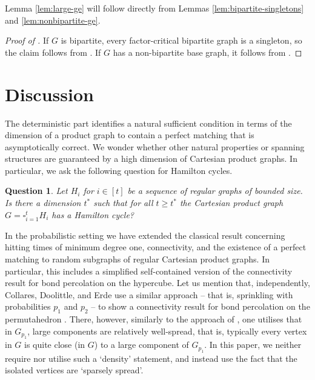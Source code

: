 \documentclass[notitlepage]{scrartcl}
\newtheorem{question}[thm]{Question}
\begin{document}
Lemma \ref{lem:large-ge} will follow directly from Lemmas \ref{lem:bipartite-singletons} and \ref{lem:nonbipartite-ge}.

\begin{proof}[Proof of ]
If $G$ is bipartite, every factor-critical bipartite graph is a singleton, so the claim follows from .
If $G$ has a non-bipartite base graph, it follows from .
\end{proof}



\section{Discussion}\label{s:discussion}

The deterministic part identifies a natural sufficient condition in terms of the dimension of a product graph to contain a perfect matching that is asymptotically correct. We wonder whether other natural properties or spanning structures are guaranteed by a high dimension of Cartesian product graphs. In particular, we ask the following question for Hamilton cycles.
\begin{question}
    Let $H_i$ for $i \in [t]$ be a sequence of regular graphs of bounded size. Is there a dimension $t^*$ such that for all $t\geq t^*$ the Cartesian product graph $G=\square_{i=1}^t H_i$ has a Hamilton cycle?
\end{question}

In the probabilistic setting we have extended the classical result concerning hitting times of minimum degree one, connectivity, and the existence of a perfect matching to random subgraphs of regular Cartesian product graphs. In particular, this includes a simplified self-contained version of the connectivity result for bond percolation on the hypercube. Let us mention that, independently, Collares, Doolittle, and Erde use a similar approach -- that is, sprinkling with probabilities $p_1$ and $p_2$ -- to show a connectivity result for bond percolation on the permutahedron \cite{CDE24}. There, however, similarly to the approach of \cite{AKS81, BKL92, K23}, one utilises that in $G_{p_1}$, large components are relatively well-spread, that is, typically every vertex in $G$ is quite close (in $G$) to a large component of $G_{p_1}$. In this paper, we neither require nor utilise such a `density' statement, and instead use the fact that the isolated vertices are `sparsely spread'. 
\end{document}
